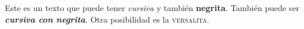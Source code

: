 \documentclass[12pt,a4paper]{report}
\author{Julian David Mora Ramos}
\begin{document}
	Este es un texto que puede tener \textit{cursiva} y también \textbf{negrita}.
	También puede ser \textit{\textbf{cursiva con negrita}}. Otra posibilidad
	es la \textsc{versalita}.
\end{document}
